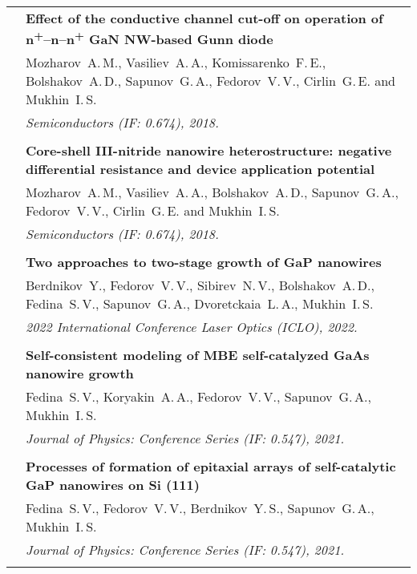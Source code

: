 \documentclass[letterpaper, 11pt]{article}
\begin{document}
\begin{longtable}{p{1.3in}p{4.8in}}
        & \textbf{Effect of the conductive channel cut-off on operation of
        n\textsuperscript{+}--n--n\textsuperscript{+} GaN NW-based Gunn diode}
        \\
        & Mozharov~A.\,M., Vasiliev~A.\,A., Komissarenko~F.\,E.,
        Bolshakov~A.\,D., Sapunov~G.\,A., Fedorov~V.\,V., Cirlin~G.\,E. and
        Mukhin~I.\,S. \\
		& \textit{Semiconductors (IF: 0.674), 2018.}\\
		& \\

        & \textbf{Core-shell III-nitride nanowire heterostructure: negative
        differential resistance and device application potential} \\
        & Mozharov~A.\,M., Vasiliev~A.\,A., Bolshakov~A.\,D., Sapunov~G.\,A.,
        Fedorov~V.\,V., Cirlin~G.\,E. and Mukhin~I.\,S. \\
        & \textit{Semiconductors (IF: 0.674), 2018.}\\
		& \\

		\nohyphens{\color{OliveGreen}{Q4 Publications}}
        & \textbf{Two approaches to two-stage growth of GaP nanowires} \\
        & Berdnikov~Y., Fedorov~V.\,V., Sibirev~N.\,V., Bolshakov~A.\,D.,
        Fedina~S.\,V., Sapunov~G.\,A., Dvoretckaia~L.\,A., Mukhin~I.\,S. \\
        & \textit{2022 International Conference Laser Optics (ICLO), 2022.}\\
		& \\

        & \textbf{Self-consistent modeling of MBE self-catalyzed GaAs nanowire
        growth} \\
        & Fedina~S.\,V., Koryakin~A.\,A., Fedorov~V.\,V., Sapunov~G.\,A.,
        Mukhin~I.\,S. \\
        & \textit{Journal of Physics: Conference Series (IF: 0.547), 2021.}\\
		& \\

        & \textbf{Processes of formation of epitaxial arrays of self-catalytic
        GaP nanowires on Si (111)} \\
        & Fedina~S.\,V., Fedorov~V.\,V., Berdnikov~Y.\,S., Sapunov~G.\,A.,
        Mukhin~I.\,S. \\
        & \textit{Journal of Physics: Conference Series (IF: 0.547), 2021.}\\
		& \\
		

\end{longtable}
\end{document}
